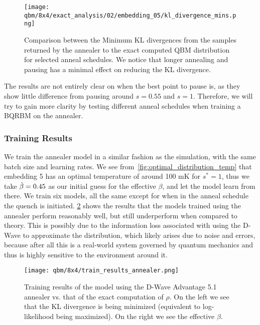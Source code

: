 \begin{figure}[!htb]
    \begin{center}
        \texttt{[image: qbm/8x4/exact\_analysis/02/embedding\_05/kl\_divergence\_mins.png]}
    \end{center}
    \caption{Comparison between the Minimum KL divergences from the samples returned by the annealer to the exact computed QBM distribution for selected anneal schedules. We notice that longer annealing and pausing has a minimal effect on reducing the KL divergence.}
    \label{fig:dkl_mins_embedding_05}
\end{figure}

The results are not entirely clear on when the best point to pause is, as they show little difference from pausing around \( s = 0.55 \) and \( s = 1 \).
Therefore, we will try to gain more clarity by testing different anneal schedules when training a BQRBM on the annealer.

\subsubsection{Training Results}
We train the annealer model in a similar fashion as the simulation, with the same batch size and learning rates.
We see from~\cref{fig:optimal_distribution_temp} that embedding 5 has an optimal temperature of around 100 \si{\milli\kelvin} for \( s^* = 1 \), thus we take \( \hat{\beta} = 0.45 \) as our initial guess for the effective \( \beta \), and let the model learn from there.
We train six models, all the same except for when in the anneal schedule the quench is initiated.
\cref{fig:train_results_annealer} shows the results that the models trained using the annealer perform reasonably well, but still underperform when compared to theory.
This is possibly due to the information loss associated with using the D-Wave to approximate the distribution, which likely arises due to noise and errors, because after all this is a real-world system governed by quantum mechanics and thus is highly sensitive to the environment around it.
\begin{figure}[!htb]
    \begin{center}
        \texttt{[image: qbm/8x4/train\_results\_annealer.png]}
    \end{center}
    \caption{Training results of the model using the D-Wave Advantage 5.1 annealer vs. that of the exact computation of \( \rho \). On the left we see that the KL divergence is being minimized (equivalent to log-likelihood being maximized). On the right we see the effective \( \beta \).}
    \label{fig:train_results_annealer}
\end{figure}

